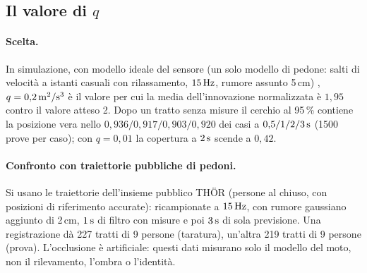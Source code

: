 \subsection{Il valore di \texorpdfstring{$q$}{q}}\label{sec:sti-q}

\paragraph{Scelta.} In simulazione, con modello ideale del sensore (un solo modello di pedone: salti di velocità a istanti casuali con rilassamento, $15\,\mathrm{Hz}$, rumore assunto 5\,cm) , $q=0{,}2\,\mathrm{m^2/s^3}$ è il valore per cui la media dell'innovazione normalizzata è $1{,}95$ contro il valore atteso 2. Dopo un tratto senza misure il cerchio al 95\,\% contiene la posizione vera nello $0{,}936/0{,}917/0{,}903/0{,}920$ dei casi a $0{,}5/1/2/3\,\mathrm{s}$ (1500 prove per caso); con $q=0{,}01$ la copertura a $2\,\mathrm{s}$ scende a $0{,}42$.

\paragraph{Confronto con traiettorie pubbliche di pedoni.} Si usano le traiettorie dell'insieme pubblico THÖR \cite{thor} (persone al chiuso, con posizioni di riferimento accurate): ricampionate a $15\,\mathrm{Hz}$, con rumore gaussiano aggiunto di 2\,cm, $1\,\mathrm{s}$ di filtro con misure e poi $3\,\mathrm{s}$ di sola previsione. Una registrazione dà 227 tratti di 9 persone (taratura), un'altra 219 tratti di 9 persone (prova). L'occlusione è artificiale: questi dati misurano solo il modello del moto, non il rilevamento, l'ombra o l'identità.

